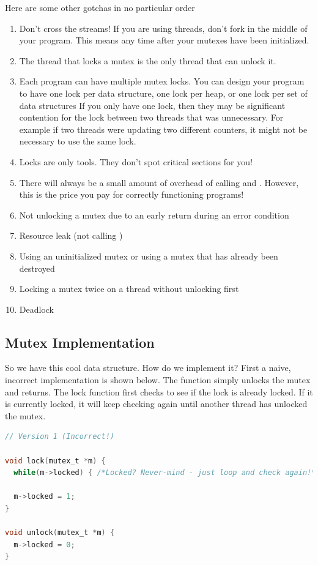 Here are some other gotchas in no particular order
\begin{enumerate}
\item Don't cross the streams!
If you are using threads, don't fork in the middle of your program.
This means any time after your mutexes have been initialized.
\item The thread that locks a mutex is the only thread that can unlock it.
\item Each program can have multiple mutex locks.
  You can design your program to have one lock per data structure,
  one lock per heap,
  or one lock per set of data structures
  If you only have one lock, then they may be significant contention for the lock between two threads that was unnecessary.
  For example if two threads were updating two different counters, it might not be necessary to use the same lock.
\item Locks are only tools.
  They don't spot critical sections for you!
\item There will always be a small amount of overhead of calling  and .
However, this is the price you pay for correctly functioning programs!
\item
  Not unlocking a mutex due to an early return during an error condition
\item
  Resource leak (not calling )
\item
  Using an uninitialized mutex or using a mutex that has already been destroyed
\item
  Locking a mutex twice on a thread without unlocking first
\item
  Deadlock
\end{enumerate}

\subsection{Mutex Implementation}

So we have this cool data structure.
How do we implement it?
First a naive, incorrect implementation is shown below.
The  function simply unlocks the mutex and returns.
The lock function first checks to see if the lock is already locked.
If it is currently locked, it will keep checking again until another thread has unlocked the mutex.

\begin{lstlisting}[language=C]
// Version 1 (Incorrect!)

void lock(mutex_t *m) {
  while(m->locked) { /*Locked? Never-mind - just loop and check again!*/ }

  m->locked = 1;
}

void unlock(mutex_t *m) {
  m->locked = 0;
}
\end{lstlisting}

